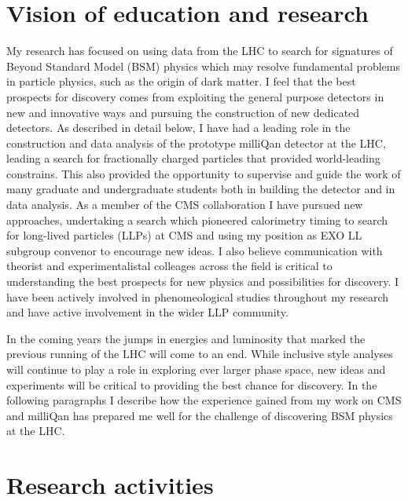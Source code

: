 \documentclass[11pt]{article}
\theoremstyle{plain} \numberwithin{equation}{section}
\theoremstyle{definition}
\newcounter{list}
\begin{document}
\section*{Vision of education and research}
\noindent 
My research has focused on using data from the LHC to search for signatures of Beyond 
Standard Model (BSM) physics which may resolve 
fundamental problems in particle physics, such as the origin of dark matter. 
I feel that the best prospects for discovery comes from exploiting
the general purpose detectors in new and innovative ways and pursuing the construction
of new dedicated detectors. As described in detail below, 
I have had a leading role in the construction and
data analysis of the prototype milliQan detector at the LHC, leading a search for fractionally
charged particles that provided world-leading constrains. This also provided the 
opportunity to supervise and guide the work of many graduate and undergraduate students both
in building the detector and in data analysis. As a member of
the CMS collaboration I have pursued new approaches, undertaking a 
search which pioneered calorimetry timing to search for long-lived particles (LLPs) at CMS 
and using my position as EXO LL subgroup convenor to encourage new ideas.
I also believe communication with theorist and experimentalistal colleages
across the field is critical to understanding the best prospects for 
new physics and possibilities for discovery. I have been actively involved
in phenomeological studies throughout my research and have
active involvement in the wider LLP community.

In the coming years the jumps in energies and luminosity that marked the previous running of the 
LHC will come to an end. While inclusive style analyses will continue to play a role in 
exploring ever larger phase space, new ideas and experiments will be critical to 
providing the best chance for discovery. In the following paragraphs I describe how the experience 
gained from my work on CMS and milliQan has prepared me well for the challenge 
of discovering BSM physics at the LHC.

\section*{Research activities}
\end{document}
